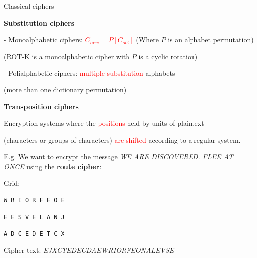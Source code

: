 \begin{frame}{Classical ciphers}

\textbf{Substitution ciphers}

\phantom{pad}- Monoalphabetic ciphers: \textcolor{red}{$C_{new} = P[C_{old}]$} (Where $P$ is an alphabet permutation)

\smallskip

\phantom{pad}(ROT-K is a monoalphabetic cipher with $P$ is a cyclic rotation)

\smallskip

\phantom{pad}- Polialphabetic ciphers: \textcolor{red}{multiple substitution} alphabets 

\phantom{pad}(more than one dictionary permutation)

\smallskip

\textbf{Transposition ciphers}

\phantom{pad}Encryption systems where the \textcolor{red}{positions} held by units of plaintext 

\phantom{pad}(characters or groups of characters) \textcolor{red}{are shifted} according to a regular system.

\smallskip

E.g. We want to encrypt the message \textit{WE ARE DISCOVERED. FLEE AT ONCE} using the \textbf{route cipher}:

Grid: 

\centerline{\texttt{W R I O R F E O E}}
\centerline{\texttt{E E S V E L A N J}}
\centerline{\texttt{A D C E D E T C X}}

Cipher text: \textit{EJXCTEDECDAEWRIORFEONALEVSE}

\end{frame}
